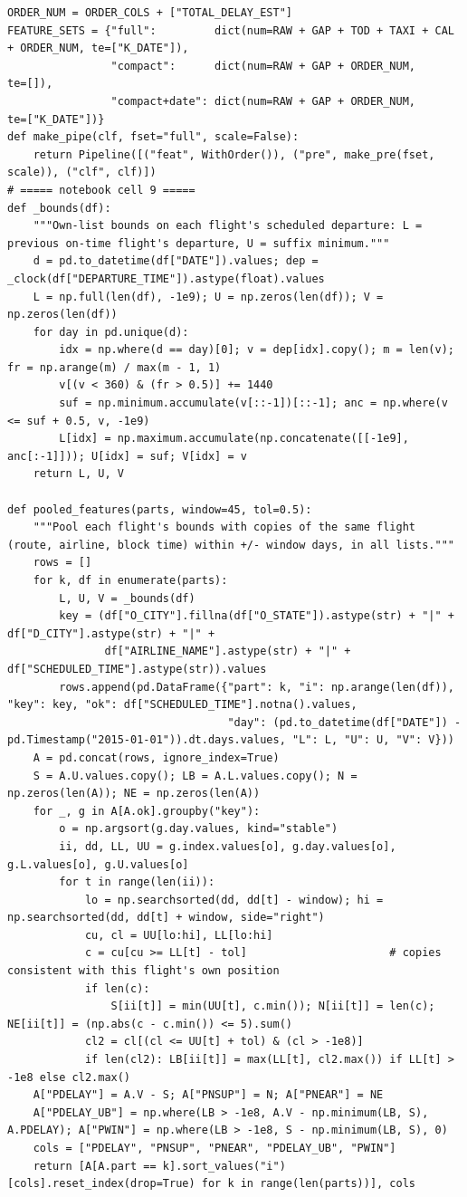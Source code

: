 \documentclass[12pt,a4paper]{article}
\begin{document}
\begin{lstlisting}[style=code]
ORDER_NUM = ORDER_COLS + ["TOTAL_DELAY_EST"]
FEATURE_SETS = {"full":         dict(num=RAW + GAP + TOD + TAXI + CAL + ORDER_NUM, te=["K_DATE"]),
                "compact":      dict(num=RAW + GAP + ORDER_NUM,                    te=[]),
                "compact+date": dict(num=RAW + GAP + ORDER_NUM,                    te=["K_DATE"])}
def make_pipe(clf, fset="full", scale=False):
    return Pipeline([("feat", WithOrder()), ("pre", make_pre(fset, scale)), ("clf", clf)])
# ===== notebook cell 9 =====
def _bounds(df):
    """Own-list bounds on each flight's scheduled departure: L = previous on-time flight's departure, U = suffix minimum."""
    d = pd.to_datetime(df["DATE"]).values; dep = _clock(df["DEPARTURE_TIME"]).astype(float).values
    L = np.full(len(df), -1e9); U = np.zeros(len(df)); V = np.zeros(len(df))
    for day in pd.unique(d):
        idx = np.where(d == day)[0]; v = dep[idx].copy(); m = len(v); fr = np.arange(m) / max(m - 1, 1)
        v[(v < 360) & (fr > 0.5)] += 1440
        suf = np.minimum.accumulate(v[::-1])[::-1]; anc = np.where(v <= suf + 0.5, v, -1e9)
        L[idx] = np.maximum.accumulate(np.concatenate([[-1e9], anc[:-1]])); U[idx] = suf; V[idx] = v
    return L, U, V

def pooled_features(parts, window=45, tol=0.5):
    """Pool each flight's bounds with copies of the same flight (route, airline, block time) within +/- window days, in all lists."""
    rows = []
    for k, df in enumerate(parts):
        L, U, V = _bounds(df)
        key = (df["O_CITY"].fillna(df["O_STATE"]).astype(str) + "|" + df["D_CITY"].astype(str) + "|" +
               df["AIRLINE_NAME"].astype(str) + "|" + df["SCHEDULED_TIME"].astype(str)).values
        rows.append(pd.DataFrame({"part": k, "i": np.arange(len(df)), "key": key, "ok": df["SCHEDULED_TIME"].notna().values,
                                  "day": (pd.to_datetime(df["DATE"]) - pd.Timestamp("2015-01-01")).dt.days.values, "L": L, "U": U, "V": V}))
    A = pd.concat(rows, ignore_index=True)
    S = A.U.values.copy(); LB = A.L.values.copy(); N = np.zeros(len(A)); NE = np.zeros(len(A))
    for _, g in A[A.ok].groupby("key"):
        o = np.argsort(g.day.values, kind="stable")
        ii, dd, LL, UU = g.index.values[o], g.day.values[o], g.L.values[o], g.U.values[o]
        for t in range(len(ii)):
            lo = np.searchsorted(dd, dd[t] - window); hi = np.searchsorted(dd, dd[t] + window, side="right")
            cu, cl = UU[lo:hi], LL[lo:hi]
            c = cu[cu >= LL[t] - tol]                      # copies consistent with this flight's own position
            if len(c):
                S[ii[t]] = min(UU[t], c.min()); N[ii[t]] = len(c); NE[ii[t]] = (np.abs(c - c.min()) <= 5).sum()
            cl2 = cl[(cl <= UU[t] + tol) & (cl > -1e8)]
            if len(cl2): LB[ii[t]] = max(LL[t], cl2.max()) if LL[t] > -1e8 else cl2.max()
    A["PDELAY"] = A.V - S; A["PNSUP"] = N; A["PNEAR"] = NE
    A["PDELAY_UB"] = np.where(LB > -1e8, A.V - np.minimum(LB, S), A.PDELAY); A["PWIN"] = np.where(LB > -1e8, S - np.minimum(LB, S), 0)
    cols = ["PDELAY", "PNSUP", "PNEAR", "PDELAY_UB", "PWIN"]
    return [A[A.part == k].sort_values("i")[cols].reset_index(drop=True) for k in range(len(parts))], cols


\end{lstlisting}
\end{document}
